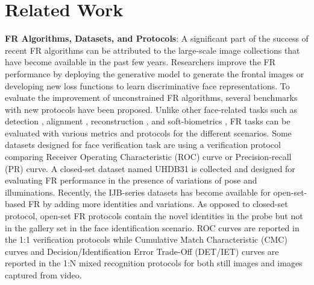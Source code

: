 \documentclass{article}
\begin{document}

\section{Related Work}
\label{SEC:FaRE-LR}
\noindent \textbf{FR Algorithms, Datasets, and Protocols}: 
A significant part of the success of recent FR algorithms can be attributed to the large-scale image collections \cite{Cao_2018_17830} that have become available in the past few years. 
Researchers improve the FR performance by deploying the generative model to generate the frontal images \cite{Tran_2017_17705} or developing new loss functions \cite{Liu_2017_180923, Deng_2018_180917} to learn discriminative face representations.
To evaluate the improvement of unconstrained FR algorithms, several benchmarks \cite{Klare_2015_17419, Whitelam_2017_17829, Maze_2018_180930} with new protocols have been proposed. 
Unlike other face-related tasks such as detection \cite{Shi_2018_180923}, alignment \cite{Xu_2016_16539, Xu_2017_17394}, reconstruction \cite{Xu_2019_180917}, and soft-biometrics \cite{Sarafianos_2018_180921}, FR tasks can be evaluated with various metrics and protocols for the different scenarios.
Some datasets \cite{Huang_2007_180918, Sengupta_2016_17835} designed for face verification task are using a verification protocol comparing Receiver Operating Characteristic (ROC) curve or Precision-recall (PR) curve.
A closed-set dataset named UHDB31 \cite{Le_2017_180921} is collected and designed for evaluating FR performance in the presence of variations of pose and illuminations.
Recently, the IJB-series datasets \cite{Klare_2015_17419, Whitelam_2017_17829, Maze_2018_180930} has become available for open-set-based FR by adding more identities and variations.
As opposed to closed-set protocol, open-set FR protocols contain the novel identities in the probe but not in the gallery set in the face identification scenario.
ROC curves are reported in the 1:1 verification protocols while Cumulative Match Characteristic (CMC) curves and Decision/Identification Error Trade-Off (DET/IET) curves are reported in the 1:N mixed recognition protocols for both still images and images captured from video.
\end{document}
